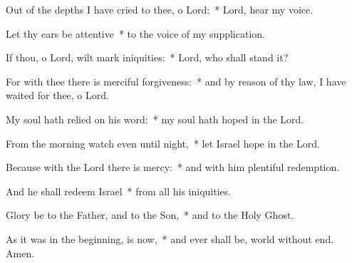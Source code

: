 \begin{enpars}
\item Out of the depths I have cried to thee, o Lord:~* Lord, hear my voice.
\item Let thy ears be attentive~* to the voice of my supplication.
\item If thou, o Lord, wilt mark iniquities:~* Lord, who shall stand it?
\item For with thee there is merciful forgiveness:~* and by reason of thy law, I have waited for thee, o Lord.
\item My soul hath relied on his word:~* my soul hath hoped in the Lord.
\item From the morning watch even until night,~* let Israel hope in the Lord.
\item Because with the Lord there is mercy:~* and with him plentiful redemption.
\item And he shall redeem Israel~* from all his iniquities.
\item Glory be to the Father, and to the Son,~* and to the Holy Ghost.
\item As it was in the beginning, is now,~* and ever shall be, world without end. Amen.
\end{enpars}